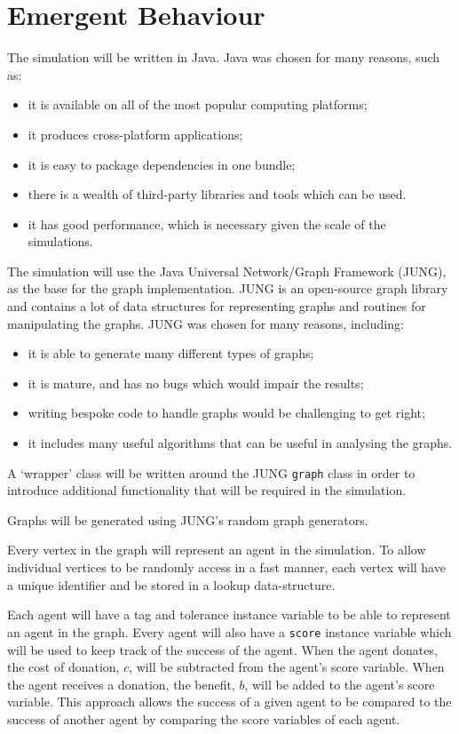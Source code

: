 \section{Emergent Behaviour}

The simulation will be written in Java.
Java was chosen for many reasons, such as:
\begin{itemize}
    \item it is available on all of the most popular computing platforms;
    \item it produces cross-platform applications;
    \item it is easy to package dependencies in one bundle;
    \item there is a wealth of third-party libraries and tools which can be
used.
    \item it has good performance, which is necessary given the scale of the
simulations.
\end{itemize}

The simulation will use the Java Universal Network/Graph Framework
(JUNG),
as the base for the graph implementation.
JUNG is an open-source graph library and contains a lot of data
structures for representing graphs and routines for manipulating the
graphs.
JUNG was chosen for many reasons, including:
\begin{itemize}
    \item it is able to generate many different types of graphs;
    \item it is mature, and has no bugs which would impair the results;
    \item writing bespoke code to handle graphs would be challenging to get
right;
    \item it includes many useful algorithms that can be useful in analysing the
graphs.
\end{itemize}

A `wrapper' class will be written around the JUNG {\tt graph} class in
order to introduce additional functionality that will be required in the
simulation.

Graphs will be generated using JUNG's random graph generators.

Every vertex in the graph will represent an agent in the simulation.
To allow individual vertices to be randomly access in a fast manner,
each vertex will have a unique identifier and be stored in a lookup
data-structure.

Each agent will have a tag and tolerance instance variable to be able to
represent an agent in the graph.
Every agent will also have a {\tt score} instance variable which will be
used to keep track of the success of the agent.
When the agent donates, the cost of donation, $c$, will be subtracted
from the agent's score variable.
When the agent receives a donation, the benefit, $b$, will be added to
the agent's score variable.
This approach allows the success of a given agent to be compared to the
success of another agent by comparing the score variables of each agent.

